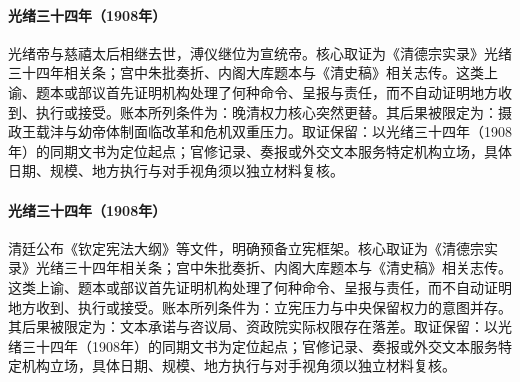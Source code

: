 \hypertarget{ledger:EQ-1908-GUANGXU-CIXI-DEATHS}{}\paragraph{光绪三十四年（1908年）}光绪帝与慈禧太后相继去世，溥仪继位为宣统帝。核心取证为《清德宗实录》光绪三十四年相关条；宫中朱批奏折、内阁大库题本与《清史稿》相关志传。这类上谕、题本或部议首先证明机构处理了何种命令、呈报与责任，而不自动证明地方收到、执行或接受。账本所列条件为：晚清权力核心突然更替。其后果被限定为：摄政王载沣与幼帝体制面临改革和危机双重压力。取证保留：以光绪三十四年（1908年）的同期文书为定位起点；官修记录、奏报或外交文本服务特定机构立场，具体日期、规模、地方执行与对手视角须以独立材料复核。
\hypertarget{ledger:EQ-1908-CONSTITUTIONAL-OUTLINE}{}\paragraph{光绪三十四年（1908年）}清廷公布《钦定宪法大纲》等文件，明确预备立宪框架。核心取证为《清德宗实录》光绪三十四年相关条；宫中朱批奏折、内阁大库题本与《清史稿》相关志传。这类上谕、题本或部议首先证明机构处理了何种命令、呈报与责任，而不自动证明地方收到、执行或接受。账本所列条件为：立宪压力与中央保留权力的意图并存。其后果被限定为：文本承诺与咨议局、资政院实际权限存在落差。取证保留：以光绪三十四年（1908年）的同期文书为定位起点；官修记录、奏报或外交文本服务特定机构立场，具体日期、规模、地方执行与对手视角须以独立材料复核。

